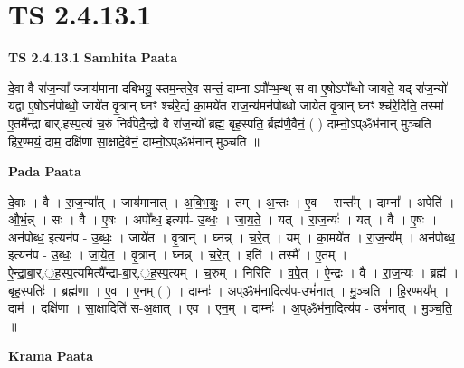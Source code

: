 \documentclass[17pt]{extarticle}
\begin{document}
\section{ TS 2.4.13.1 }

\textbf{TS 2.4.13.1 } \newline
\textbf{Samhita Paata} \newline

दे॒वा वै रा॑ज॒न्या᳚-ज्जाय॑माना-दबिभयु॒-स्तम॒न्तरे॒व सन्तं॒ दाम्ना ऽपौ᳚म्भ॒न्थ् स वा ए॒षोऽपो᳚ब्धो जायते॒ यद्-रा॑ज॒न्यो॑ यद्वा ए॒षोऽन॑पोब्धो॒ जाये॑त वृ॒त्रान् घ्नꣳ श्च॑रे॒द्यं का॒मये॑त राज॒न्य॑मन॑पोब्धो जायेत वृ॒त्रान् घ्नꣳ श्च॑रे॒दिति॒ तस्मा॑ ए॒तमै᳚न्द्रा बार्.हस्प॒त्यं च॒रुं निर्व॑पेदै॒न्द्रो वै रा॑ज॒न्यो᳚ ब्रह्म॒ बृह॒स्पति॒ र्ब्रह्म॑णै॒वैनं॒ ( ) दाम्नो॒ऽप्ॐभ॑नान् मुञ्चति हिर॒ण्मयं॒ दाम॒ दक्षि॑णा सा॒क्षादे॒वैनं॒ दाम्नो॒ऽप्ॐभ॑नान् मुञ्चति ॥ \newline

\textbf{Pada Paata} \newline

दे॒वाः । वै । रा॒ज॒न्या᳚त् । जाय॑मानात् ।   अ॒बि॒भ॒युः॒ । तम् । अ॒न्तः । ए॒व । सन्त᳚म् ।   दाम्ना᳚ । अपेति॑ । औ॒भं॒न्न् । सः । वै । ए॒षः । अपो᳚ब्ध॒ इत्यप॑- उ॒ब्धः॒ । जा॒य॒ते॒ । यत् । रा॒ज॒न्यः॑ । यत् । वै । ए॒षः । अन॑पोब्ध॒ इत्यन॑प - उ॒ब्धः॒ । जाये॑त । वृ॒त्रान् । घ्नन्न् । च॒रे॒त् । यम् । का॒मये॑त । रा॒ज॒न्य᳚म् । अन॑पोब्ध॒ इत्यन॑प - उ॒ब्धः॒ । जा॒ये॒त॒ । वृ॒त्रान् । घ्नन्न् । च॒रे॒त् । इति॑ । तस्मै᳚ । ए॒तम् । ऐ॒न्द्रा॒बा॒र्.॒ह॒स्प॒त्यमित्यै᳚न्द्रा-बा॒र्.॒ह॒स्प॒त्यम् । च॒रुम् । निरिति॑ । व॒पे॒त् ।   ऐ॒न्द्रः । वै । रा॒ज॒न्यः॑ । ब्रह्म॑ । बृह॒स्पतिः॑ । ब्रह्म॑णा । ए॒व । ए॒न॒म् ( ) । दाम्नः॑ । अ॒प्ॐभ॑ना॒दित्य॑प-उभं॑नात् । मु॒ञ्च॒ति॒ । हि॒र॒ण्मय᳚म् । दाम॑ । दक्षि॑णा । सा॒क्षादिति॑ स-अ॒क्षात् । ए॒व । ए॒न॒म् । दाम्नः॑ । अ॒प्ॐभ॑ना॒दित्य॑प - उभं॑नात् । मु॒ञ्च॒ति॒ ॥  \newline


\textbf{Krama Paata} \newline
\end{document}
